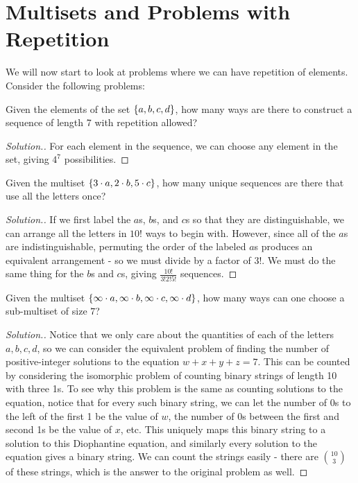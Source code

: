 \section{Multisets and Problems with Repetition}
We will now start to look at problems where we can have repetition of elements. Consider the following problems: 
\begin{problem}{2}
Given the elements of the set $\left\{a, b, c, d\right\}$, how many ways are there to construct a sequence of length 7 with repetition allowed?  
\end{problem}
\begin{proof}[Solution.]
For each element in the sequence, we can choose any element in the set, giving $\boxed{4^7}$ possibilities.
\end{proof}
\begin{problem}{3}
Given the multiset $\left\{ 3\cdot a, 2\cdot b, 5 \cdot c \right\}$, how many unique sequences are there that use all the letters once?
\end{problem}
\begin{proof}[Solution.]
If we first label the $a$s, $b$s, and $c$s so that they are distinguishable, we can arrange all the letters in $10!$ ways to begin with. However, since all of the $a$s are indistinguishable, permuting the order of the labeled $a$s produces an equivalent arrangement - so we must divide by a factor of $3!$. We must do the same thing for the $b$s and $c$s, giving $\boxed{\frac{10!}{3! 2! 5!}}$ sequences. 
\end{proof}
\begin{problem}{4}
Given the multiset $\left\{ \infty \cdot a, \infty \cdot b, \infty \cdot c, \infty \cdot d \right\}$, how many ways can one choose a sub-multiset of size $7$? 
\end{problem}
\begin{proof}[Solution.]
Notice that we only care about the quantities of each of the letters $a, b, c, d$, so we can consider the equivalent problem of finding the number of positive-integer solutions to the equation $w + x + y + z = 7$. This can be counted by considering the isomorphic problem of counting binary strings of length 10 with three 1s. To see why this problem is the same as counting solutions to the equation, notice that for every such binary string, we can let the number of $0$s to the left of the first 1 be the value of $w$, the number of $0$s between the first and second 1s be the value of $x$, etc. This uniquely maps this binary string to a solution to this Diophantine equation, and similarly every solution to the equation gives a binary string. We can count the strings easily - there are  $\boxed{\binom{10}{3}}$ of these strings, which is the answer to the original problem as well.
\end{proof}
